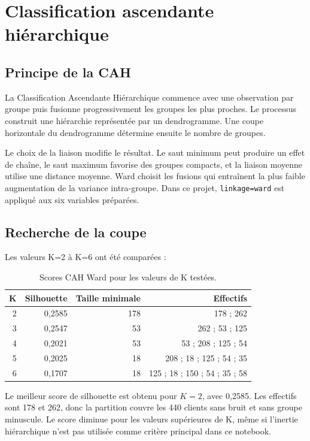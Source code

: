 \chapter{Classification ascendante hiérarchique}

\section{Principe de la CAH}
La Classification Ascendante Hiérarchique commence avec une observation par groupe puis fusionne progressivement les groupes les plus proches. Le processus construit une hiérarchie représentée par un dendrogramme. Une coupe horizontale du dendrogramme détermine ensuite le nombre de groupes.

Le choix de la liaison modifie le résultat. Le saut minimum peut produire un effet de chaîne, le saut maximum favorise des groupes compacts, et la liaison moyenne utilise une distance moyenne. Ward choisit les fusions qui entraînent la plus faible augmentation de la variance intra-groupe. Dans ce projet, \texttt{linkage=ward} est appliqué aux six variables préparées.

\section{Recherche de la coupe}
Les valeurs K=2 à K=6 ont été comparées :
\begin{table}[H]
\centering
\caption{Scores CAH Ward pour les valeurs de K testées.}
\label{tab:cahsearch}
\begin{tabular}{rrrr}
\toprule
K & Silhouette & Taille minimale & Effectifs \\
\midrule
2 & 0,2585 & 178 & 178 ; 262 \\
3 & 0,2547 & 53 & 262 ; 53 ; 125 \\
4 & 0,2021 & 53 & 53 ; 208 ; 125 ; 54 \\
5 & 0,2025 & 18 & 208 ; 18 ; 125 ; 54 ; 35 \\
6 & 0,1707 & 18 & 125 ; 18 ; 150 ; 54 ; 35 ; 58 \\
\bottomrule
\end{tabular}
\end{table}


Le meilleur score de silhouette est obtenu pour $K=2$, avec 0,2585. Les effectifs sont 178 et 262, donc la partition couvre les 440 clients sans bruit et sans groupe minuscule. Le score diminue pour les valeurs supérieures de K, même si l'inertie hiérarchique n'est pas utilisée comme critère principal dans ce notebook.

